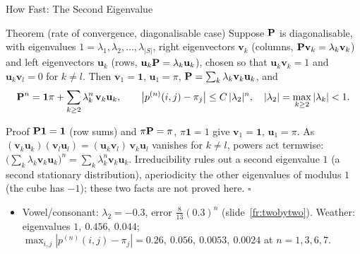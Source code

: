\begin{frame}{How Fast: The Second Eigenvalue}
  \label{fr:convrate}
  \small
  \begin{block}{Theorem (rate of convergence, diagonalisable case)}
    Suppose $\mathbf{P}$ is diagonalisable, with eigenvalues $1=\lambda_1,\lambda_2,\dots,\lambda_{|S|}$, right eigenvectors $\mathbf v_k$ (columns, $\mathbf{P}\mathbf v_k=\lambda_k\mathbf v_k$) and left eigenvectors $\mathbf u_k$ (rows, $\mathbf u_k\mathbf{P}=\lambda_k\mathbf u_k$), chosen so that $\mathbf u_k\mathbf v_k=1$ and $\mathbf u_k\mathbf v_l=0$ for $k\ne l$. Then $\mathbf v_1=\mathbf 1$, $\mathbf u_1=\pi$, $\mathbf{P}=\sum_k\lambda_k\mathbf v_k\mathbf u_k$, and
    \[
      \mathbf{P}^n=\mathbf 1\pi+\sum_{k\ge2}\lambda_k^n\,\mathbf v_k\mathbf u_k,\qquad
      \big|p^{(n)}(i,j)-\pi_j\big|\le C\,|\lambda_2|^n,\quad |\lambda_2|=\max_{k\ge2}|\lambda_k|<1 .
    \]
  \end{block}
  \begin{block}{Proof}
    $\mathbf{P}\mathbf 1=\mathbf 1$ (row sums) and $\pi\mathbf{P}=\pi$, $\pi\mathbf 1=1$ give $\mathbf v_1=\mathbf 1$, $\mathbf u_1=\pi$. As $(\mathbf v_k\mathbf u_k)(\mathbf v_l\mathbf u_l)=(\mathbf u_k\mathbf v_l)\,\mathbf v_k\mathbf u_l$ vanishes for $k\ne l$, powers act termwise: $\big(\sum_k\lambda_k\mathbf v_k\mathbf u_k\big)^n=\sum_k\lambda_k^n\mathbf v_k\mathbf u_k$. Irreducibility rules out a second eigenvalue $1$ (a second stationary distribution), aperiodicity the other eigenvalues of modulus $1$ (the cube has $-1$); these two facts are not proved here. \hfill$\square$
  \end{block}
  \begin{itemize}
    \item Vowel/consonant: $\lambda_2=-0.3$, error $\tfrac8{13}(0.3)^n$ (slide~\ref{fr:twobytwo}). Weather: eigenvalues $1,\ 0.456,\ 0.044$; $\max_{i,j}|p^{(n)}(i,j)-\pi_j|=0.26,\ 0.056,\ 0.0053,\ 0.0024$ at $n=1,3,6,7$.
  \end{itemize}
\end{frame}

